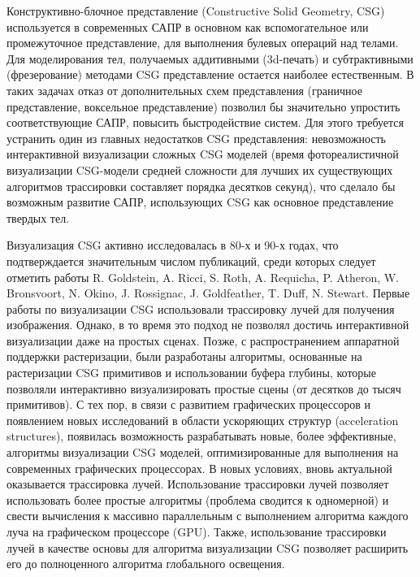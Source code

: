 
{\actuality} Конструктивно-блочное представление (Constructive Solid Geometry, CSG) используется в современных САПР в основном как вспомогательное или промежуточное представление, для выполнения булевых операций над телами. Для моделирования тел, получаемых аддитивными (3d-печать) и субтрактивными (фрезерование) методами CSG представление остается наиболее естественным. В таких задачах отказ от дополнительных схем представления (граничное представление, воксельное представление) позволил бы значительно упростить соответствующие САПР, повысить быстродействие систем. Для этого требуется устранить один из главных недостатков CSG представления: невозможность интерактивной визуализации сложных CSG моделей (время фотореалистичной визуализации CSG-модели средней сложности для лучших их существующих алгоритмов трассировки составляет порядка десятков секунд), что сделало бы возможным развитие САПР, использующих CSG как основное представление твердых тел.

Визуализация CSG активно исследовалась в 80-х и 90-х годах, что подтверждается значительным числом публикаций, среди которых следует отметить работы R. Goldstein, A. Ricci, S. Roth, A. Requicha, P. Atheron, W. Bronsvoort, N. Okino, J. Rossignac, J. Goldfeather, T. Duff, N. Stewart. Первые работы по визуализации CSG использовали трассировку лучей для получения изображения. Однако, в то время это подход не позволял достичь интерактивной визуализации даже на простых сценах. Позже, с распространением аппаратной поддержки растеризации, были разработаны алгоритмы, основанные на растеризации  CSG примитивов и использовании буфера глубины, которые позволяли интерактивно визуализировать простые сцены (от десятков до тысяч примитивов). С тех пор, в связи с развитием графических процессоров и появлением новых исследований в области ускоряющих структур (acceleration structures), появилась возможность разрабатывать новые, более эффективные, алгоритмы визуализации CSG моделей, оптимизированные для выполнения на современных графических процессорах. В новых условиях, вновь актуальной оказывается трассировка лучей. Использование трассировки лучей позволяет использовать более простые алгоритмы (проблема сводится к одномерной) и свести вычисления к массивно параллельным с выполнением алгоритма каждого луча на графическом процессоре (GPU). Также, использование трассировки лучей в качестве основы для алгоритма визуализации CSG позволяет расширить его до полноценного алгоритма глобального освещения.

